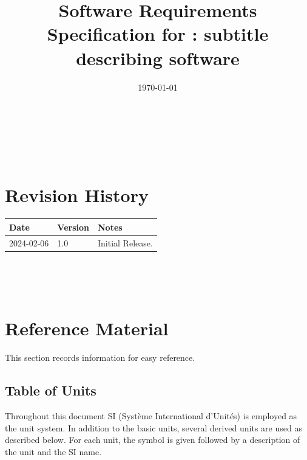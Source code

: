 \documentclass[12pt]{article}
\begin{document}
\title{Software Requirements Specification for \progname: subtitle describing software} 
\author{\authname}
\date{\today}
	
\maketitle

~\newpage


\tableofcontents

~\newpage

\section*{Revision History}

\begin{tabularx}{\textwidth}{p{3cm}p{2cm}X}
\toprule {\bf Date} & {\bf Version} & {\bf Notes}\\
\midrule
2024-02-06 & 1.0 & Initial Release.\\
\bottomrule
\end{tabularx}

~\\

~\newpage

\section{Reference Material}

This section records information for easy reference.

\subsection{Table of Units}

Throughout this document SI (Syst\`{e}me International d'Unit\'{e}s) is employed
as the unit system.  In addition to the basic units, several derived units are
used as described below.  For each unit, the symbol is given followed by a
description of the unit and the SI name.
~\newline
\end{document}
